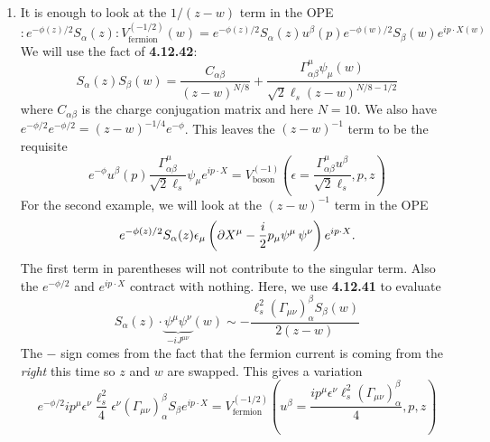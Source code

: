 \documentclass[11pt, class=article, crop=false]{standalone}
\begin{document}
\begin{enumerate}
	\item It is enough to look at the $1/(z-w)$ term in the OPE
	\[
		:e^{-\phi(z)/2} S_\alpha(z): V^{(-1/2)}_{\text{fermion}}(w) = e^{-\phi(z)/2} S_\alpha(z) u^\beta(p) e^{-\phi(w)/2} S_\beta(w) e^{i p \cdot X(w)}
	\]
	We will use the fact of \textbf{4.12.42}:
	\[
		S_\alpha(z) S_\beta(w) = \frac{C_{\alpha \beta}}{(z-w)^{N/8}} + \frac{\Gamma^\mu_{\alpha \beta} \psi_\mu(w)}{\sqrt 2 \ell_s (z-w)^{N/8-1/2}}
	\]
	where $C_{\alpha \beta}$ is the charge conjugation matrix and here $N=10$. We also have $e^{-\phi/2} e^{-\phi/2} = (z-w)^{-1/4} e^{-\phi}$. This leaves the $(z-w)^{-1}$ term to be the requisite  
	\[
		e^{-\phi} u^\beta(p) \frac{\Gamma^\mu_{\alpha \beta}}{\sqrt 2 \ell_s} \psi_\mu e^{i p \cdot X} = V^{(-1)}_{\text{boson}}(\epsilon = \frac{\Gamma^\mu_{\alpha \beta} u^\beta}{\sqrt 2 \ell_s}, p, z)
	\] 
	For the second example, we will look at the $(z-w)^{-1}$ term in the OPE
	\[
		e^{-\phi(z)/2} S_\alpha(z) \epsilon_\mu \left(\partial X^\mu- \frac i2 p_\mu \psi^\mu\, \psi^\nu \right) e^{i p \cdot X}.
	\]
	The first term in parentheses will not contribute to the singular term. Also the $e^{-\phi/2}$ and $e^{i p \cdot X}$ contract with nothing. Here, we use \textbf{4.12.41} to evaluate
	\[
		 S_\alpha(z) \cdot \underbrace{\psi^\mu \psi^\nu}_{-i J^{\mu \nu}} (w) \sim - \frac{\ell_s^2 (\Gamma_{\mu \nu})^\beta_\alpha S_\beta (w)}{2 (z-w)}
	\]
	The $-$ sign comes from the fact that the fermion current is coming from the \emph{right} this time so $z$ and $w$ are swapped.  
	This gives a variation
	\[
		e^{-\phi/2} i p^\mu \epsilon^\nu \frac{\ell_s^2}{4} \epsilon^\nu (\Gamma_{\mu \nu})^{\beta}_{\alpha} S_\beta e^{i p \cdot X} =  V^{(-1/2)}_{\text{fermion}} (u^\beta = \frac{i p^\mu \epsilon^\nu \ell_s^2  (\Gamma_{\mu \nu})^\beta_\alpha}{4}, p, z)
	\]
	

\end{enumerate}
\end{document}
